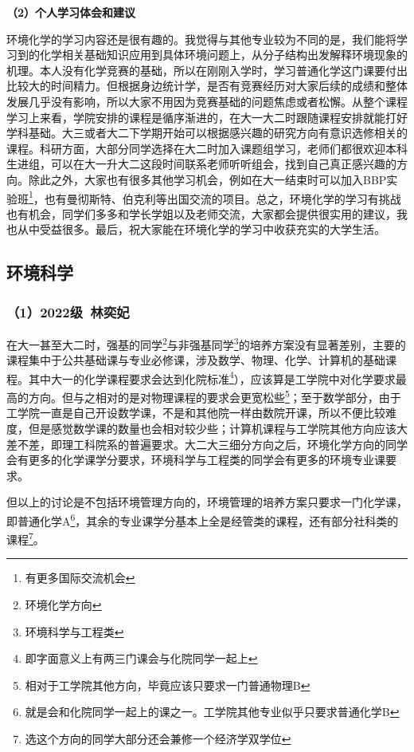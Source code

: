 \documentclass[11pt,oneside]{book}
\begin{document}
\vspace{10pt}

\textbf{（2）个人学习体会和建议}

环境化学的学习内容还是很有趣的。我觉得与其他专业较为不同的是，我们能将学习到的化学相关基础知识应用到具体环境问题上，从分子结构出发解释环境现象的机理。本人没有化学竞赛的基础，所以在刚刚入学时，学习普通化学这门课要付出比较大的时间精力。但根据身边统计学，是否有竞赛经历对大家后续的成绩和整体发展几乎没有影响，所以大家不用因为竞赛基础的问题焦虑或者松懈。从整个课程学习上来看，学院安排的课程是循序渐进的，在大一大二时跟随课程安排就能打好学科基础。大三或者大二下学期开始可以根据感兴趣的研究方向有意识选修相关的课程。科研方面，大部分同学选择在大二时加入课题组学习，老师们都很欢迎本科生进组，可以在大一升大二这段时间联系老师听听组会，找到自己真正感兴趣的方向。除此之外，大家也有很多其他学习机会，例如在大一结束时可以加入BBP实验班\footnote{有更多国际交流机会}，也有曼彻斯特、伯克利等出国交流的项目。总之，环境化学的学习有挑战也有机会，同学们多多和学长学姐以及老师交流，大家都会提供很实用的建议，我也从中受益很多。最后，祝大家能在环境化学的学习中收获充实的大学生活。

\subsection{环境科学}

\subsubsection{（1）2022级\ 林奕妃}

在大一甚至大二时，强基的同学\footnote{环境化学方向}与非强基同学\footnote{环境科学与工程类}的培养方案没有显著差别，主要的课程集中于公共基础课与专业必修课，涉及数学、物理、化学、计算机的基础课程。其中大一的化学课程要求会达到化院标准\footnote{即字面意义上有两三门课会与化院同学一起上}），应该算是工学院中对化学要求最高的方向。但与之相对的是对物理课程的要求会更宽松些\footnote{相对于工学院其他方向，毕竟应该只要求一门普通物理B}；至于数学部分，由于工学院一直是自己开设数学课，不是和其他院一样由数院开课，所以不便比较难度，但是感觉数学课的数量也会相对较少些；计算机课程与工学院其他方向应该大差不差，即理工科院系的普遍要求。大二大三细分方向之后，环境化学方向的同学会有更多的化学课学分要求，环境科学与工程类的同学会有更多的环境专业课要求。

\vspace{10pt}

但以上的讨论是不包括环境管理方向的，环境管理的培养方案只要求一门化学课，即普通化学A\footnote{就是会和化院同学一起上的课之一。工学院其他专业似乎只要求普通化学B}，其余的专业课学分基本上全是经管类的课程，还有部分社科类的课程\footnote{选这个方向的同学大部分还会兼修一个经济学双学位}。
\end{document}
